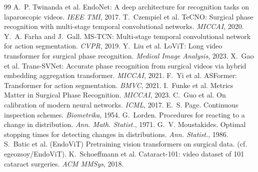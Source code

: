 \documentclass[11pt]{article}
\begin{document}
\begin{thebibliography}{99}\small
{} A.~P. Twinanda et al. EndoNet: A deep architecture for
recognition tasks on laparoscopic videos. \emph{IEEE TMI}, 2017.
 T.~Czempiel et al. TeCNO: Surgical phase recognition with
multi-stage temporal convolutional networks. \emph{MICCAI}, 2020.
 Y.~A. Farha and J.~Gall. MS-TCN: Multi-stage temporal
convolutional network for action segmentation. \emph{CVPR}, 2019.
 Y.~Liu et al. LoViT: Long video transformer for surgical phase
recognition. \emph{Medical Image Analysis}, 2023.
 X.~Gao et al. Trans-SVNet: Accurate phase recognition from
surgical videos via hybrid embedding aggregation transformer. \emph{MICCAI}, 2021.
 F.~Yi et al. ASFormer: Transformer for action segmentation.
\emph{BMVC}, 2021.
 I.~Funke et al. Metrics Matter in Surgical Phase Recognition.
\emph{MICCAI}, 2023.
 C.~Guo et al. On calibration of modern neural networks.
\emph{ICML}, 2017.
 E.~S. Page. Continuous inspection schemes. \emph{Biometrika},
1954.
 G.~Lorden. Procedures for reacting to a change in distribution.
\emph{Ann. Math. Statist.}, 1971.
 G.~V. Moustakides. Optimal stopping times for detecting
changes in distributions. \emph{Ann. Statist.}, 1986.
 S.~Batic et al. (EndoViT) Pretraining vision transformers on
surgical data. (cf. egeozsoy/EndoViT).
 K.~Schoeffmann et al. Cataract-101: video dataset of 101
cataract surgeries. \emph{ACM MMSys}, 2018.
\end{thebibliography}
\end{document}
